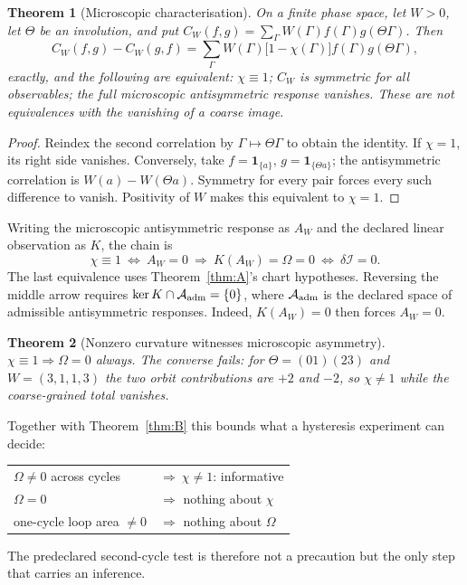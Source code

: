 \documentclass[aps,prd,twocolumn,superscriptaddress,nofootinbib]{revtex4-2}
\newcommand{\cI}{\mathcal{I}}
\newtheorem{theorem}{Theorem}
\begin{document}
\begin{theorem}[Microscopic characterisation]\label{thm:N}
On a finite phase space, let $W>0$, let $\Theta$ be an involution, and put $C_W(f,g)=\sum_\Gamma W(\Gamma)f(\Gamma)g(\Theta\Gamma)$. Then
\begin{equation}
C_W(f,g)-C_W(g,f)=\sum_\Gamma W(\Gamma)\bigl[1-\chi(\Gamma)\bigr]f(\Gamma)g(\Theta\Gamma),
\end{equation}
exactly, and the following are equivalent: $\chi\equiv1$; $C_W$ is symmetric for
all observables; the full microscopic antisymmetric response vanishes.
These are not equivalences with the vanishing of a coarse image.
\end{theorem}
\begin{proof}
Reindex the second correlation by $\Gamma\mapsto\Theta\Gamma$ to obtain the
identity. If $\chi=1$, its right side vanishes. Conversely, take
$f=\mathbf1_{\{a\}}$, $g=\mathbf1_{\{\Theta a\}}$; the antisymmetric
correlation is $W(a)-W(\Theta a)$. Symmetry for every pair forces every such
difference to vanish. Positivity of $W$ makes this equivalent to $\chi=1$.
\end{proof}
Writing the microscopic antisymmetric response as $A_W$ and the declared
linear observation as $K$, the chain is
\[
\chi\equiv1\ \Longleftrightarrow\ A_W=0\ \Longrightarrow\
K(A_W)=\Omega=0\ \Longleftrightarrow\ \delta\cI=0.
\]
The last equivalence uses Theorem~\ref{thm:A}'s chart hypotheses. Reversing
the middle arrow requires $\ker K\cap\mathcal A_{\rm adm}=\{0\}$, where
$\mathcal A_{\rm adm}$ is the declared space of admissible antisymmetric responses.
Indeed, $K(A_W)=0$ then forces $A_W=0$.

\begin{theorem}[Nonzero curvature witnesses microscopic asymmetry]\label{thm:O}
$\chi\equiv1\Rightarrow\Omega=0$ always. The converse fails: for
$\Theta=(01)(23)$ and $W=(3,1,1,3)$ the two orbit contributions are $+2$ and
$-2$, so $\chi\neq1$ while the coarse-grained total vanishes.
\end{theorem}

Together with Theorem~\ref{thm:B} this bounds what a hysteresis experiment can
decide:
\begin{center}
\begin{tabular}{ll}
$\Omega\neq0$ across cycles & $\Rightarrow\ \chi\neq1$: informative\\
$\Omega=0$ & $\Rightarrow$ nothing about $\chi$\\
one-cycle loop area $\neq0$ & $\Rightarrow$ nothing about $\Omega$\\
\end{tabular}
\end{center}
The predeclared second-cycle test is therefore not a precaution but the only
step that carries an inference.
\end{document}
